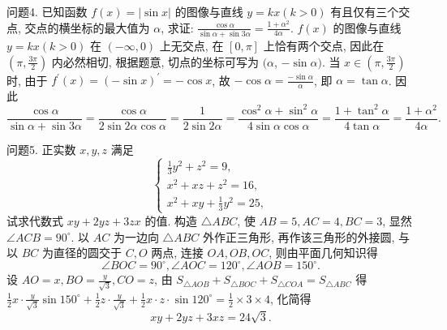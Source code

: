 问题4. 已知函数 $f(x)=|\sin x|$ 的图像与直线 $y=k x(k>0)$ 有且仅有三个交点, 交点的横坐标的最大值为 $\alpha$, 求证: $\frac{\cos \alpha}{\sin \alpha+\sin 3 \alpha}=\frac{1+\alpha^2}{4 \alpha}$. 
$f(x)$ 的图像与直线 $y=k x(k>0)$ 在 $(-\infty, 0)$ 上无交点, 在 $[0, \pi]$ 上恰有两个交点, 因此在 $\left(\pi, \frac{3 \pi}{2}\right)$ 内必然相切, 根据题意, 切点的坐标可写为 $(\alpha$, $-\sin \alpha)$. 当 $x \in\left(\pi, \frac{3 \pi}{2}\right)$ 时, 由于 $f^{\prime}(x)=(-\sin x)^{\prime}=-\cos x$, 故 $-\cos \alpha= \frac{-\sin \alpha}{\alpha}$, 即 $\alpha=\tan \alpha$. 因此
$$
\frac{\cos \alpha}{\sin \alpha+\sin 3 \alpha}=\frac{\cos \alpha}{2 \sin 2 \alpha \cos \alpha}=\frac{1}{2 \sin 2 \alpha}=\frac{\cos ^2 \alpha+\sin ^2 \alpha}{4 \sin \alpha \cos \alpha}=\frac{1+\tan ^2 \alpha}{4 \tan \alpha}=\frac{1+\alpha^2}{4 \alpha} \text {. }
$$



问题5. 正实数 $x, y, z$ 满足
$$
\left\{\begin{array}{l}
\frac{1}{3} y^2+z^2=9, \label{eq1}\\
x^2+x z+z^2=16, \label{eq2}\\
x^2+x y+\frac{1}{3} y^2=25, \label{eq3}
\end{array}\right.
$$
试求代数式 $x y+2 y z+3 z x$ 的值.
构造 $\triangle A B C$, 使 $A B=5, A C=4, B C=3$, 显然 $\angle A C B=90^{\circ}$.
以 $A C$ 为一边向 $\triangle A B C$ 外作正三角形, 再作该三角形的外接圆, 与以 $B C$ 为直径的圆交于 $C, O$ 两点, 连接 $O A, O B, O C$, 则由平面几何知识得
$$
\angle B O C=90^{\circ}, \angle A O C=120^{\circ}, \angle A O B=150^{\circ} .
$$
设 $A O=x, B O=\frac{y}{\sqrt{3}}, C O=z$, 由 $S_{\triangle A O B}+S_{\triangle B O C}+S_{\triangle C O A}=S_{\triangle A B C}$ 得 $\frac{1}{2} x \cdot \frac{y}{\sqrt{3}} \sin 150^{\circ}+\frac{1}{2} z \cdot \frac{y}{\sqrt{3}}+\frac{1}{2} x \cdot z \cdot \sin 120^{\circ}=\frac{1}{2} \times 3 \times 4$, 化简得
$$
x y+2 y z+3 x z=24 \sqrt{3} .
$$



